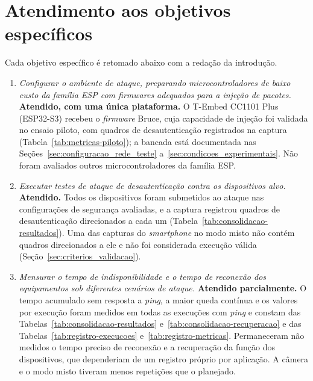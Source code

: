 \section{Atendimento aos objetivos específicos}
\label{sec:atendimento_objetivos}

Cada objetivo específico é retomado abaixo com a redação da introdução.

\begin{enumerate}[label=\arabic*.]
    \item \textit{Configurar o ambiente de ataque, preparando microcontroladores de baixo custo da família ESP com firmwares adequados para a injeção de pacotes.} \textbf{Atendido, com uma única plataforma.} O T-Embed CC1101 Plus (ESP32-S3) recebeu o \textit{firmware} Bruce, cuja capacidade de injeção foi validada no ensaio piloto, com quadros de desautenticação registrados na captura (Tabela~\ref{tab:metricas-piloto}); a bancada está documentada nas Seções~\ref{sec:configuracao_rede_teste} a~\ref{sec:condicoes_experimentais}. Não foram avaliados outros microcontroladores da família ESP.

    \item \textit{Executar testes de ataque de desautenticação contra os dispositivos alvo.} \textbf{Atendido.} Todos os dispositivos foram submetidos ao ataque nas configurações de segurança avaliadas, e a captura registrou quadros de desautenticação direcionados a cada um (Tabela~\ref{tab:consolidacao-resultados}). Uma das capturas do \textit{smartphone} no modo misto não contém quadros direcionados a ele e não foi considerada execução válida (Seção~\ref{sec:criterios_validacao}).

    \item \textit{Mensurar o tempo de indisponibilidade e o tempo de reconexão dos equipamentos sob diferentes cenários de ataque.} \textbf{Atendido parcialmente.} O tempo acumulado sem resposta a \textit{ping}, a maior queda contínua e os valores por execução foram medidos em todas as execuções com \textit{ping} e constam das Tabelas~\ref{tab:consolidacao-resultados} e~\ref{tab:consolidacao-recuperacao} e das Tabelas~\ref{tab:registro-execucoes} e~\ref{tab:registro-metricas}. Permaneceram não medidos o tempo preciso de reconexão e a recuperação da função dos dispositivos, que dependeriam de um registro próprio por aplicação. A câmera e o modo misto tiveram menos repetições que o planejado.


\end{enumerate}
